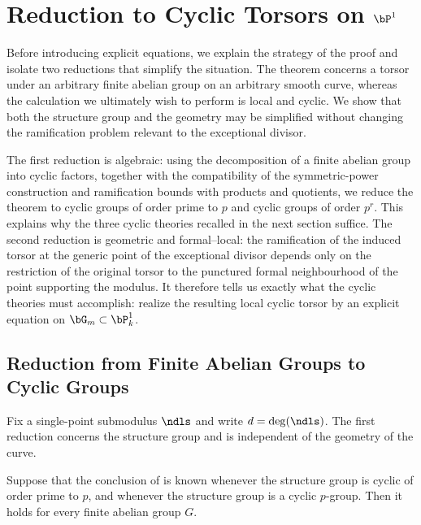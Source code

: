 \section{Reduction to Cyclic Torsors on \texorpdfstring{$\bP^1$}{P1}}
\label{section:reductions_before_cyclic_theories}

Before introducing explicit equations, we explain the strategy of the proof
and isolate two reductions that simplify the situation. The theorem concerns
a torsor under an arbitrary finite abelian group on an arbitrary smooth curve,
whereas the calculation we ultimately wish to perform is local and cyclic. We
show that both the structure group and the geometry may be simplified without
changing the ramification problem relevant to the exceptional divisor.

The first reduction is algebraic: using the decomposition of a finite abelian
group into cyclic factors, together with the compatibility of the
symmetric-power construction and ramification bounds with products and
quotients, we reduce the theorem to cyclic groups of order prime to $p$ and
cyclic groups of order $p^r$. This explains why the three cyclic theories
recalled in the next section suffice. The second reduction is geometric and
formal--local: the ramification of the induced torsor at the generic point of
the exceptional divisor depends only on the restriction of the original
torsor to the punctured formal neighbourhood of the point supporting the
modulus. It therefore tells us exactly what the cyclic theories must
accomplish: realize the resulting local cyclic torsor by an explicit equation
on $\bG_m \subset \bP^1_k$.

\subsection{Reduction from Finite Abelian Groups to Cyclic Groups}

Fix a single-point submodulus $\ndls$ and write $d=\deg(\ndls)$. The first
reduction concerns the structure group and is independent of the geometry of
the curve.

\begin{prop}
\label{prop:reduction_to_cyclic_groups}
Suppose that the conclusion of
 is known whenever the structure
group is cyclic of order prime to $p$, and whenever the structure group is a
cyclic $p$-group. Then it holds for every finite abelian group $G$.
\end{prop}

